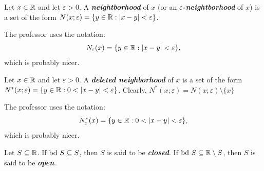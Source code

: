 \documentclass[12pt]{article}
\begin{document}
\begin{definition}[Neighborhood]
  Let $x\in\mathbb{R}$ and let $\varepsilon>0$. A \textit{\textbf{neightborhood}}
  of $x$ (or an \textit{\textbf{$\varepsilon$-neightborhood}} of $x$) is a
  set of the form $N(x; \varepsilon) = \{ y \in \mathbb{R} : \left|x - y\right| < \varepsilon \}$.
  \begin{remark}
    The professor uses the notation: $$N_\varepsilon(x) = \{ y \in \mathbb{R} :
    \left|x - y\right| < \varepsilon \},$$ which is probably nicer.
  \end{remark}
\end{definition}

\begin{definition}
  Let $x \in \mathbb{R}$ and let $\varepsilon > 0$. A \textit{\textbf{deleted neighborhood}} of
  $x$ is a set of  the form $N^*(x; \varepsilon)=\{ y \in \mathbb{R} : 0 <  \left|x - y\right| < \varepsilon\}$.
  Clearly, $N^*(x; \varepsilon) = N(x; \varepsilon) \setminus \{ x \}$
  \begin{remark}
    The professor uses the notation: $$N_\varepsilon^*(x) = \{  y \in \mathbb{R} : 0 < \left|x -
    y\right| < \varepsilon\},$$ which is probably nicer.
  \end{remark}
\end{definition}

\begin{definition}
  Let   $S  \subseteq   \mathbb{R}$.  If   $\text{bd }S  \subseteq   S$,  then   $S$  is   said  to   be
  \textit{\textbf{closed}}. If  $\text{bd }S \subseteq \mathbb{R} \setminus  S$, then $S$ is  said to be
  \textit{\textbf{open}}.
\end{definition}

\end{document}
